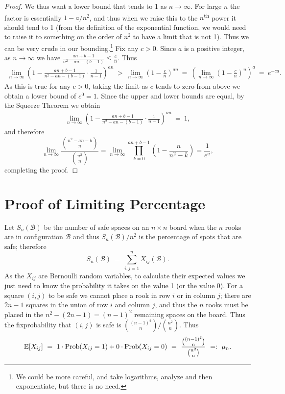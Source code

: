 \documentclass[12pt,reqno]{amsart}
\newcommand{\E}{\mathbb{E}}
\renewcommand{\E}{\mathbb{E}}
\numberwithin{equation}{section}
\theoremstyle{plain}
\newcommand\be{\begin{equation}}
\newcommand\ee{\end{equation}}
\newcommand\bea{\begin{eqnarray}}
\newcommand\eea{\end{eqnarray}}
\newcommand{\ncr}[2]{{#1 \choose #2}}
\begin{document}
\begin{proof}
We thus want a lower bound that tends to 1 as $n\to\infty$. For large $n$ the factor is essentially $1 - a/n^2$, and thus when we raise this to the $n$\textsuperscript{th} power it should tend to 1 (from the definition of the exponential function, we would need to raise it to something on the order of $n^2$ to have a limit that is not 1). Thus we can be very crude in our bounding.\footnote{We could be more careful, and take logarithms, analyze and then exponentiate, but there is no need.} Fix any $c > 0$. Since $a$ is a positive integer, as $n\rightarrow \infty$ we have $\frac{an+b-1}{n^2 - an - (b-1)} \leq \frac{c}{n}$. Thus
\begin{align}
    \lim_{n\rightarrow \infty}\left(1 - \frac{an+b-1}{n^2 - an -
    (b-1)} \cdot \frac{1}{n-1}\right)^{an}\ > \ \lim_{n\rightarrow \infty} \left(1- \frac{c}{n}\right)^{an} \ = \ \left(\lim_{n\to\infty}\left(1 - \frac{c}{n}\right)^n\right)^a \ = \ e^{-ca}.
\end{align}
As this is true for any $c>0$, taking the limit as $c$ tends to zero from above we obtain a lower bound of $e^0 = 1$. Since the upper and lower bounds are equal, by the Squeeze Theorem we obtain
\begin{align}
   \lim_{n\rightarrow \infty}\left(1 - \frac{an+b-1}{n^2 - an -
    (b-1)} \cdot \frac{1}{n-1}\right)^{an}\ =\ 1,
\end{align} and therefore
\be \lim_{n\rightarrow \infty} \frac{\ncr{n^2 - an -b}{n}}{\ncr{n^2}{n}} = \lim_{n\rightarrow \infty}\prod_{k=0}^{an+b-1}\left(1-\frac{n}{n^2 - k}\right) = \frac{1}{e^a}, \ee
completing the proof. \end{proof}


\section{Proof of Limiting Percentage}\label{sec:mainproof}

Let $S_n(\mathcal{B})$ be the number of safe spaces on an $n\times n$ board when the $n$ rooks are in configuration $\mathcal{B}$ and thus $S_n(\mathcal{B})/n^2$ is the percentage of spots that are safe; therefore \be S_n(\mathcal{B}) \ = \ \sum_{i,j=1}^n X_{ij}(\mathcal{B}). \ee As the $X_{ij}$ are Bernoulli random variables, to calculate their expected values we just need to know the probability it takes on the value 1 (or the value 0). For a square $(i,j)$ to be safe we cannot place a rook in row $i$ or in column $j$; there are $2n-1$ squares in the union of row $i$ and column $j$, and thus the $n$ rooks must be placed in the $n^2 - (2n-1) = (n-1)^2$ remaining spaces on the board. Thus the fixprobability that $(i,j)$ is safe is $\ncr{(n-1)^2}{n} / \ncr{n^2}{n}$. Thus
\bea \E[X_{ij}]  \ = \ 1 \cdot {\rm Prob}(X_{ij} = 1) + 0 \cdot {\rm Prob}(X_{ij} = 0) \ = \ \frac{\ncr{(n-1)^2}{n}}{\ncr{n^2}{n}} \ =: \ \mu_n.\eea 
\end{document}
